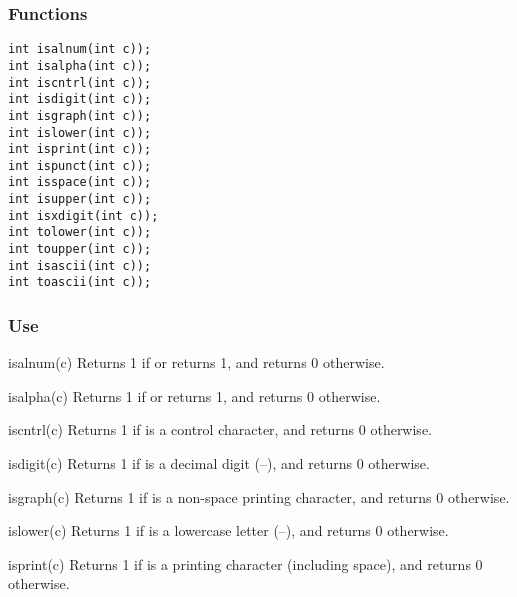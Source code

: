 \subsubsection*{Functions}
\begin{verbatim}
int isalnum(int c));
int isalpha(int c));
int iscntrl(int c));
int isdigit(int c));
int isgraph(int c));
int islower(int c));
int isprint(int c));
int ispunct(int c));
int isspace(int c));
int isupper(int c));
int isxdigit(int c));
int tolower(int c));
int toupper(int c));
int isascii(int c));
int toascii(int c));
\end{verbatim}

\subsubsection*{Use}

\begin{defun}{isalnum}{(c)}
Returns 1 if  or  returns 1,
and returns 0 otherwise.
\end{defun}

\begin{defun}{isalpha}{(c)}
Returns 1 if  or  returns 1,
and returns 0 otherwise.
\end{defun}

\begin{defun}{iscntrl}{(c)}
Returns 1 if  is a control character,
and returns 0 otherwise.
\end{defun}

\begin{defun}{isdigit}{(c)}
Returns 1 if  is a decimal digit (--), and
returns 0 otherwise.
\end{defun}

\begin{defun}{isgraph}{(c)}
Returns 1 if  is a non-space printing character, and returns 0
otherwise.
\end{defun}

\begin{defun}{islower}{(c)}
Returns 1 if  is a lowercase letter (--),
and returns 0 otherwise.
\end{defun}

\begin{defun}{isprint}{(c)}
Returns 1 if  is a printing character (including space), and
returns 0 otherwise.
\end{defun}

